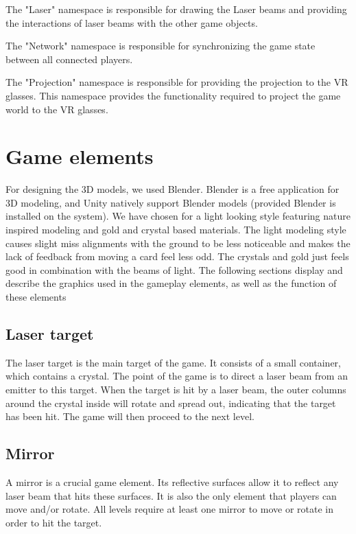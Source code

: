 		The "Laser" namespace is responsible for drawing the Laser beams and
		providing the interactions of laser beams with the other game objects.

		The "Network" namespace is responsible for synchronizing the game state
		between all connected players.

		The "Projection" namespace is responsible for providing the projection to
		the VR glasses. This namespace provides the functionality required to project
		the game world to the VR glasses.

	\section{Game elements} \label{sec:graphicaldesign}
		For designing the 3D models, we used Blender. Blender is a free application
		for 3D modeling, and Unity natively support Blender models (provided Blender
		is installed on the system). We have chosen for a light looking style featuring 
		nature inspired modeling and gold and crystal based materials. The light modeling 
		style causes slight miss alignments with the ground to be less noticeable and
		makes the lack of feedback from moving a card feel less odd. The crystals and gold 
		just feels good in combination with the beams of light.
		The following sections display and describe the graphics used in
		the gameplay elements, as well as the function of
		these elements
			\subsection{Laser target}\label{ssec:lasertarget}
			The laser target is the main target of the game. It consists of
			a small container, which contains a crystal. The point of the
			game is to direct a laser beam from an emitter to this target.
			When the target is hit by a laser beam, the outer columns around
			the crystal inside will rotate and spread out, indicating that
			the target has been hit. The game will then proceed to the
			next level.
			\subsection{Mirror}\label{ssec:mirror}
			A mirror is a crucial game element. Its reflective surfaces
			allow it to reflect any laser beam that hits these surfaces.
			It is also the only element that players can move and/or rotate.
			All levels require at least one mirror to move or rotate
			in order to hit the target. 
